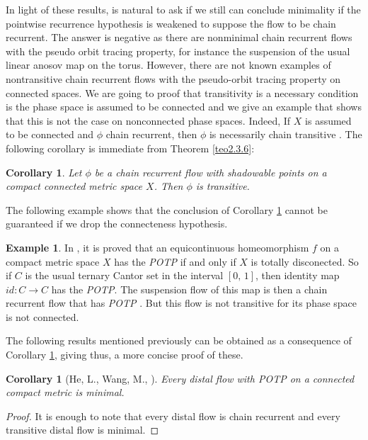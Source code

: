 \documentclass{amsart}
\newtheorem{corollary}[theorem]{Corollary}
\theoremstyle{definition}
\newtheorem{example}[theorem]{Example}
\begin{document}
In light of these results, is natural to ask if we still can conclude minimality if the pointwise recurrence hypothesis is weakened to suppose the flow to be chain recurrent. The answer is negative as there are nonminimal chain recurrent flows  with the pseudo orbit tracing property, for instance the suspension of the usual linear anosov map on the torus. However, there are not known examples of nontransitive chain recurrent flows with the pseudo-orbit tracing property on connected spaces. We are going to proof that transitivity is a necessary condition is the phase space is assumed to be connected and we give an example that shows that this is not the case on nonconnected phase spaces. Indeed, If $X$ is assumed to be connected and $\phi$ chain recurrent, then $\phi$ is necessarily chain transitive \cite{Alongi07}. The following corollary is immediate from Theorem \ref{teo2.3.6}:

\begin{corollary}\label{coroim}
    Let $\phi$ be a chain recurrent flow with shadowable points on a compact connected metric space $X$. Then $\phi$ is transitive.
\end{corollary}

The following example shows that the conclusion of Corollary \ref{coroim} cannot be guaranteed if we drop the connecteness hypothesis.
\begin{example}
	In \cite{mo}, it is proved that an equicontinuous homeomorphism $f$ on a compact metric space $X$  has the {\em POTP} if and only if $X$ is totally disconected. So if $C$ is the usual ternary Cantor set in the interval $[0,\,1]$, then identity map $id\colon C\to C$ has the {\em POTP}. The suspension flow of this map is then a chain recurrent flow that has {\em POTP} \cite{Thomas84}. But this flow is not transitive for its phase space is not connected. 
\end{example}


The following results mentioned previously can be obtained as a consequence of Corollary \ref{coroim}, giving thus, a more concise proof of these.



\begin{corollary}[He, L., Wang, M., \cite{He95}]
	Every distal flow with POTP on a connected compact metric is minimal.
\end{corollary}

\begin{proof}
It is enough to note that every distal flow is chain recurrent and every transitive distal flow is minimal.
\end{proof}
\end{document}
